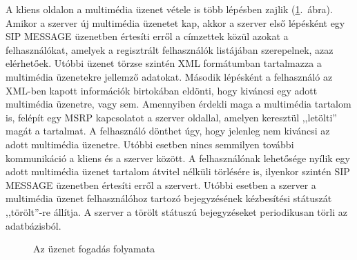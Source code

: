 A kliens oldalon a multimédia üzenet vétele is több lépésben zajlik (\ref{fig:receiving_proc}.~ábra). Amikor a szerver új multimédia üzenetet kap, akkor a szerver első lépésként egy SIP MESSAGE üzenetben értesíti erről a címzettek közül azokat a felhasználókat, amelyek a regisztrált felhasználók listájában szerepelnek, azaz elérhetőek. Utóbbi üzenet törzse szintén XML formátumban tartalmazza a multimédia üzenetekre jellemző adatokat. Második lépésként a felhasználó az XML-ben kapott információk birtokában eldönti, hogy kiváncsi egy adott multimédia üzenetre, vagy sem. Amennyiben érdekli maga a multimédia tartalom is, felépít egy MSRP kapcsolatot a szerver oldallal, amelyen keresztül ,,letölti'' magát a tartalmat. A felhasználó dönthet úgy, hogy jelenleg nem kiváncsi az adott multimédia üzenetre. Utóbbi esetben nincs semmilyen további kommunikáció a kliens és a szerver között. A felhasználónak lehetősége nyílik egy adott multimédia üzenet tartalom átvitel nélküli törlésére is, ilyenkor szintén SIP MESSAGE üzenetben értesíti erről a szervert. Utóbbi esetben a szerver a multimédia üzenet felhasználóhoz tartozó bejegyzésének kézbesítési státuszát ,,törölt''-re állítja. A szerver a törölt státuszú bejegyzéseket periodikusan törli az adatbázisból.

\begin{figure}[htbp]
\center
{}
\caption{Az üzenet fogadás folyamata}
\label{fig:receiving_proc}
\end{figure}

